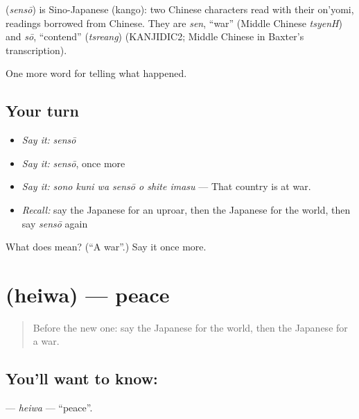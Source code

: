 \begin{cousinweb}
\textbf{} (\emph{sensō}) is Sino-Japanese (kango): two Chinese characters read with their on'yomi, readings borrowed from Chinese. They are \emph{sen}, \textquotedblleft{}war\textquotedblright{} (Middle Chinese \emph{tsyenH}) and \emph{sō}, \textquotedblleft{}contend\textquotedblright{} (\emph{tsreang}) (KANJIDIC2; Middle Chinese in Baxter's transcription).
\end{cousinweb}

\begin{grammarlens}[title={What you've built}]
One more word for telling what happened.
\end{grammarlens}

\subsection*{Your turn}
\begin{itemize}
\raggedright
  \item \emph{Say it:} \emph{sensō}
  \item \emph{Say it:} \emph{sensō}, once more
  \item \emph{Say it:} \emph{sono kuni wa sensō o shite imasu} — That country is at war.
  \item \emph{Recall:} say the Japanese for an uproar, then the Japanese for the world, then say \emph{sensō} again
\end{itemize}

\begin{tcolorbox}[breakable,colback=teal!4,colframe=teal!35!black,title={Before you move on}]
What does  mean? (\textquotedblleft{}A war\textquotedblright{}.) Say it once more.
\end{tcolorbox}
\section[\texorpdfstring{\ja{へいわ} (heiwa)}{へいわ (heiwa)}]{ (heiwa) — peace}

\label{lesson:JA-C282-heiwa}



\begin{quote}
Before the new one: say the Japanese for the world, then the Japanese for a war.
\end{quote}

\subsection*{You'll want to know: }
\textbf{} — \emph{heiwa} — \textquotedblleft{}peace\textquotedblright{}.

